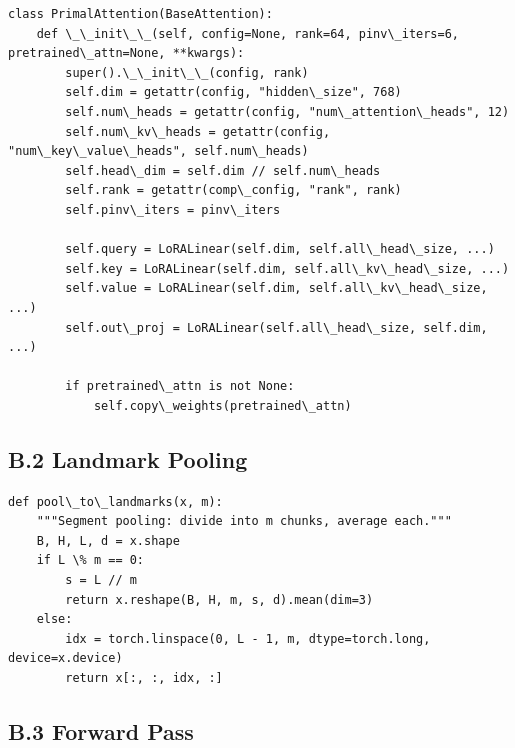 \begin{lstlisting}
class PrimalAttention(BaseAttention):
    def \_\_init\_\_(self, config=None, rank=64, pinv\_iters=6, pretrained\_attn=None, **kwargs):
        super().\_\_init\_\_(config, rank)
        self.dim = getattr(config, "hidden\_size", 768)
        self.num\_heads = getattr(config, "num\_attention\_heads", 12)
        self.num\_kv\_heads = getattr(config, "num\_key\_value\_heads", self.num\_heads)
        self.head\_dim = self.dim // self.num\_heads
        self.rank = getattr(comp\_config, "rank", rank)
        self.pinv\_iters = pinv\_iters
        
        self.query = LoRALinear(self.dim, self.all\_head\_size, ...)
        self.key = LoRALinear(self.dim, self.all\_kv\_head\_size, ...)
        self.value = LoRALinear(self.dim, self.all\_kv\_head\_size, ...)
        self.out\_proj = LoRALinear(self.all\_head\_size, self.dim, ...)
        
        if pretrained\_attn is not None:
            self.copy\_weights(pretrained\_attn)
\end{lstlisting}

\subsection{B.2 Landmark Pooling}

\begin{lstlisting}
def pool\_to\_landmarks(x, m):
    """Segment pooling: divide into m chunks, average each."""
    B, H, L, d = x.shape
    if L \% m == 0:
        s = L // m
        return x.reshape(B, H, m, s, d).mean(dim=3)
    else:
        idx = torch.linspace(0, L - 1, m, dtype=torch.long, device=x.device)
        return x[:, :, idx, :]
\end{lstlisting}

\subsection{B.3 Forward Pass}

